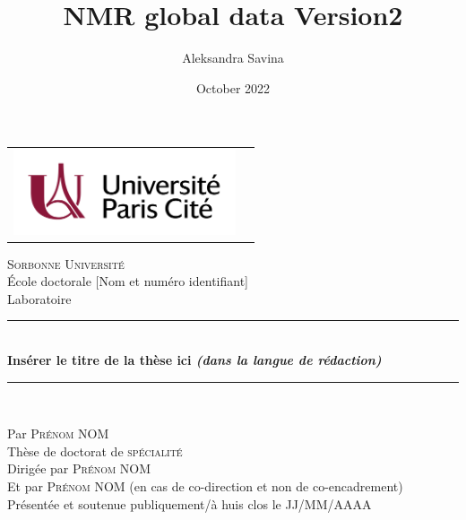 \documentclass[a4paper,12pt,twoside,english]{book}
\title{NMR global data Version2}
\author{Aleksandra Savina}
\date{October 2022}
\begin{document}
	\begin{titlepage}
		\begin{center}
			\begin{tabular}{c@{\hskip 7cm}c@{\hskip 1cm}}
				\includegraphics[height=2.5cm]{figures/PageTitre/UParisCitelogo.jpg} &
			\end{tabular}
		\end{center}
	
		\begin{center}
		
\vspace*{.03\textheight}
\textsc{\LARGE Sorbonne Université}\\[0.2cm] %
		\large École doctorale [Nom et numéro identifiant]\\
		  Laboratoire \\ 
  
  			\vfill
 
	 		\rule{\textwidth}{0.8pt} \\ %
	 		\vspace{10pt}
	 		 { \LARGE \bfseries Insérer le titre de la thèse ici \textit{(dans la langue de rédaction)}} %
	 		 \vspace{10pt}
	 		 \rule{\textwidth}{0.8pt} \\ %
		\end{center}
		
		\vfill
		\begin{center}
			Par \textsc{\Large Prénom NOM}\\[1cm] 
			Thèse de doctorat de \textsc{\large spécialité}\\[1.2cm]
			Dirigée par \textsc{\large Prénom NOM}\\[0.2cm]
            Et par \textsc{\large Prénom NOM} (en cas de co-direction et non de co-encadrement) \\[0.2cm] 
			Présentée et soutenue publiquement/à huis clos le JJ/MM/AAAA %
		\end{center}
		

\end{titlepage}
\end{document}
